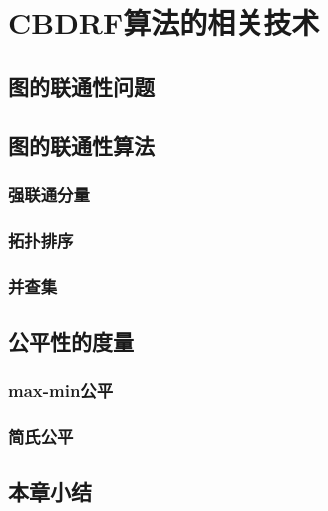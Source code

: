 \chapter{CBDRF算法的相关技术}
\label{chap:outline}
\section{图的联通性问题}
\section{图的联通性算法}
\subsection{强联通分量}
\subsection{拓扑排序}
\subsection{并查集}
\section{公平性的度量}
\subsection{max-min公平}
\subsection{简氏公平}
\section{本章小结}
